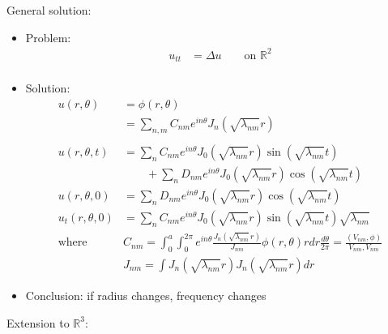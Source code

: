 \documentclass[12pt, a4paper]{article}
\begin{document}
General solution:
\begin{itemize}
    \item Problem:
    \begin{align*}
        u_{tt} &= \Delta u\qquad \text{on }\mathbb{R}^2\\
    \end{align*}
    \item Solution:
    \begin{align*}
        u(r, \theta) &= \phi(r, \theta)\\
        &=\sum_{n,m}C_{nm}e^{in\theta}J_n(\sqrt{\lambda_{nm}}r)\\\\
        u(r, \theta, t) &= \sum_nC_{nm}e^{in\theta}J_0(\sqrt{\lambda_{nm}}r)\sin(\sqrt{\lambda_{nm}}t) \\
        &\qquad+ \sum_nD_{nm}e^{in\theta}J_0(\sqrt{\lambda_{nm}}r)\cos(\sqrt{\lambda_{nm}}t)\\
        u(r, \theta, 0) &= \sum_nD_{nm}e^{in\theta}J_0(\sqrt{\lambda_{nm}}r)\cos(\sqrt{\lambda_{nm}}t)\\
        u_t(r, \theta, 0) &=\sum_nC_{nm}e^{in\theta}J_0(\sqrt{\lambda_{nm}}r)\sin(\sqrt{\lambda_{nm}}t)\sqrt{\lambda_{nm}}\\
        \text{where }&C_{nm} = \int_0^a\int_0^{2\pi}e^{in\theta} \frac{J_n(\sqrt{\lambda_{nm}}r)}{J_{nm}}\phi(r, \theta)rdr\frac{d\theta}{2\pi} = \frac{(V_{nm}, \phi)}{V_{nm}, V_{nm}}\\
        &J_{nm} = \int J_n(\sqrt{\lambda_{nm}}r)J_n(\sqrt{\lambda_{nm}}r)dr
    \end{align*}
    \item Conclusion: if radius changes, frequency changes\\
\end{itemize}
Extension to $\mathbb{R}^3$:
\end{document}

